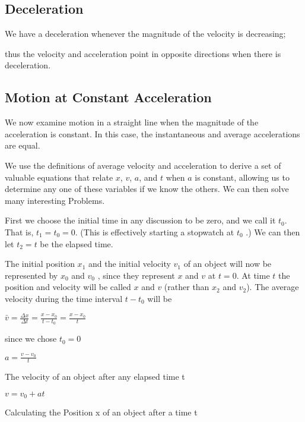 \documentclass{extarticle}
\begin{document}
\begin{tcolorbox}[enhanced jigsaw,sharp corners,coltext=black,colback=BurntOrange!25!white,boxrule=0pt,breakable,size=minimal]
\subsection{Deceleration}
We have a deceleration whenever the magnitude of the velocity is decreasing;

thus the velocity and acceleration point in opposite directions when there is deceleration.







\subsection{Motion at Constant Acceleration}

We now examine motion in a straight line when the magnitude of the acceleration is constant. In this case, the instantaneous and average accelerations are equal.


We use the definitions of average velocity and acceleration to derive a set of valuable equations that relate $x$, $v$, $a$, and $t$ when $a$ is constant, allowing us to determine any one of these variables if we know the others. We can then solve many interesting Problems.

First we choose the initial time in any discussion to be zero, and we call it $t_0$.
That is,  $t_1 = t_0 = 0$. (This is effectively starting a stopwatch at $t_0$ .)
We can then let $t_2 = t$ be the elapsed time.

The initial position $x_1$ and the initial velocity $v_1$  of an object will now be represented by $x_0$ and $v_0$ , since they represent $x$ and $v$ at $t = 0$.
At time $t$ the position and velocity will be called $x$ and $v$ (rather than $x_2$ and $v_2$).
The average velocity during the time interval $t - t_0$ will be

$\bar{v} = \frac{\Delta x}{\Delta t} = \frac{x - x_0}{t - t_0} = \frac{x - x_0}{t}$

since we chose $t_0 = 0$


$a = \frac{v - v_0}{t}$


The velocity of an object after any elapsed time t

$v = v_0 + at$

Calculating the 
Position x of an object after a time t


\end{tcolorbox}
\end{document}
